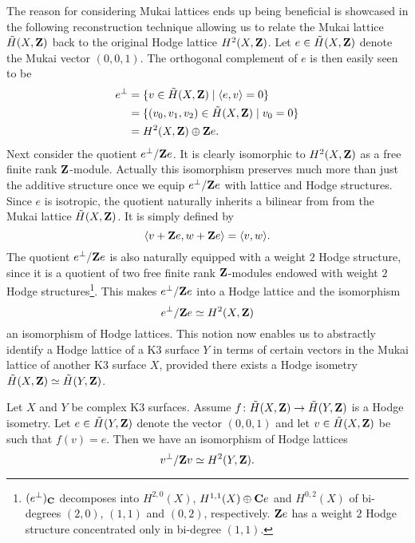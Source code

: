 The reason for considering Mukai lattices ends up being beneficial is showcased in the following reconstruction technique allowing us to relate the Mukai lattice $\,\tilde{\!{H}}(X, \mathbf Z)$ back to the original Hodge lattice $H^{2}(X, \mathbf Z)$.
Let $e \in \,\tilde{\!{H}}(X, \mathbf Z)$ denote the Mukai vector $(0,0,1)$.
The orthogonal complement of $e$ is then easily seen to be
\begin{align*}
    e^\perp &= \{ v \in \,\tilde{\!{H}}(X, \mathbf Z) \mid \langle e, v \rangle = 0\} \\
    &= \{(v_0, v_1, v_2) \in \,\tilde{\!{H}}(X, \mathbf Z) \mid v_0 = 0\} \\
    &= H^{2}(X, \mathbf Z) \oplus \mathbf Z e.
\end{align*}
Next consider the quotient $e^\perp / \mathbf Z e$. It is clearly isomorphic to $H^{2}(X, \mathbf Z)$ as a free finite rank $\mathbf Z$-module. Actually this isomorphism preserves much more than just the additive structure once we equip ${e}^\perp / \mathbf Z{e}$ with lattice and Hodge structures. Since $e$ is isotropic, the quotient naturally inherits a bilinear from from the Mukai lattice $\,\tilde{\!{H}}(X, \mathbf Z)$. It is simply defined by
\[
    \langle v + \mathbf Z e, w + \mathbf Z e \rangle = \langle v, w \rangle.
\]
The quotient ${e}^\perp / \mathbf Z{e}$ is also naturally equipped with a weight $2$ Hodge structure, since it is a quotient of two free finite rank $\mathbf Z$-modules endowed with weight $2$ Hodge structures\footnote{
    $(e^\perp)_\mathbf C$ decomposes into $H^{2,0}(X)$, $H^{1,1}(X) \oplus \mathbf C e$ and $H^{0,2}(X)$ of bi-degrees $(2,0)$, $(1,1)$ and $(0,2)$, respectively. $\mathbf Z e$ has a weight $2$ Hodge structure concentrated only in bi-degree $(1,1)$.
}. This makes ${e}^\perp / \mathbf Z{e}$ into a Hodge lattice and the isomorphism
\[
    {e}^\perp / \mathbf Z{e} \simeq H^{2}(X, \mathbf Z)
\]
an isomorphism of Hodge lattices. This notion now enables us to abstractly identify a Hodge lattice of a K3 surface $Y$ in terms of certain vectors in the Mukai lattice of another K3 surface $X$, provided there exists a Hodge isometry $\,\tilde{\!{H}}(X, \mathbf Z) \simeq \,\tilde{\!{H}}(Y, \mathbf Z)$.  
\begin{proposition}
    \label{Hodge lattice described by v}
    Let $X$ and $Y$ be complex K3 surfaces. Assume $f \colon \,\tilde{\!{H}}(X, \mathbf Z) \to \,\tilde{\!{H}}(Y, \mathbf Z)$ is a Hodge isometry. Let $e \in \,\tilde{\!{H}}(Y, \mathbf Z)$ denote the vector $(0,0,1)$ and let $v \in \,\tilde{\!{H}}(X, \mathbf Z)$ be such that $f(v) = e$. Then we have an isomorphism of Hodge lattices
    \[
        {v}^\perp / \mathbf Z{v} \simeq H^{2}(Y, \mathbf Z).
    \]
\end{proposition}

